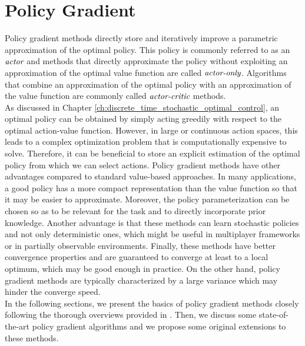\chapter{Policy Gradient}

Policy gradient methods directly store and iteratively improve a parametric approximation of the optimal policy. This policy is commonly referred to as an $\emph{actor}$ and methods that directly approximate the policy without exploiting an approximation of the optimal value function are called $\emph{actor-only}$. Algorithms that combine an approximation of the optimal policy with an approximation of the value function are commonly called $\emph{actor-critic}$ methods.\\
As discussed in Chapter \ref{ch:discrete_time_stochastic_optimal_control}, an optimal policy can be obtained by simply acting greedily with respect to the optimal action-value function. However, in large or continuous action spaces, this leads to a complex optimization problem that is computationally expensive to solve. Therefore, it can be beneficial to store an explicit estimation of the optimal policy from which we can select actions. Policy gradient methods have other advantages compared to standard value-based approaches. In many applications, a good policy has a more compact		representation than the value function so that it may be easier to approximate. Moreover, the policy parameterization can be chosen so as to be relevant for the task and to directly incorporate prior knowledge. Another advantage is that these methods can learn stochastic policies and not only deterministic ones, which might be useful in multiplayer frameworks or in partially observable environments. Finally, these methods have better convergence properties and are guaranteed to converge at least to a local optimum, which may be good enough in practice. On the other hand, policy gradient methods are typically characterized by a large variance which may hinder the converge speed.\\
In the following sections, we present the basics of policy gradient methods closely following the thorough overviews provided in \cite{peters2008reinforcement}. Then, we discuss some state-of-the-art policy gradient algorithms and we propose some original extensions to these methods. 

